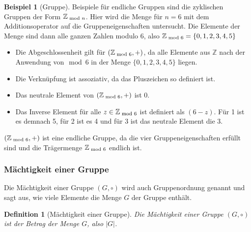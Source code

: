 \documentclass[12pt,a4paper, usenames, dvipsnames]{article}
\theoremstyle{mystyle}
\newtheorem{definition}{Definition}
\theoremstyle{definition}
\newtheorem{bsp}{Beispiel}[definition]
\begin{document}
\begin{bsp}[Gruppe]

Beispiele für endliche Gruppen sind die zyklischen Gruppen der Form $\mathbb{Z}_{\hspace*{-0.3em}\mod n}$. Hier wird die Menge für $n=6$ mit dem Additionsoperator auf die Gruppeneigenschaften untersucht. Die Elemente der Menge sind dann alle ganzen Zahlen modulo 6, also $\mathbb{Z}_{\hspace*{-0.3em}\mod 6}=\{0,1,2,3,4,5\}$
\begin{itemize}
\item Die Abgeschlossenheit gilt für $(\mathbb{Z}_{\hspace*{-0.3em}\mod 6}, +)$, da alle Elemente aus $\mathbb{Z}$ nach der Anwendung von$\mod 6$ in der Menge $\{0,1,2,3,4,5\}$ liegen.
\item Die Verknüpfung ist assoziativ, da das Pluszeichen so definiert ist.
\item Das neutrale Element von $(\mathbb{Z}_{\hspace*{-0.3em}\mod 6}, +)$ ist $0$.
\item Das Inverse Element für alle $z \in \mathbb{Z}_{\hspace*{-0.3em}\mod 6}$ ist definiert als $(6-z)$. Für 1 ist es demnach 5, für 2 ist es 4 und für 3 ist das neutrale Element die 3.
\end{itemize}

$(\mathbb{Z}_{\hspace*{-0.3em}\mod 6}, +)$ ist eine endliche Gruppe, da die vier Gruppeneigenschaften erfüllt sind und die Trägermenge $\mathbb{Z}_{\hspace*{-0.3em}\mod 6}$ endlich ist.

\end{bsp}

\subsubsection*{Mächtigkeit einer Gruppe}

\label{Abschnitt_MächtigkeitGruppe}

Die Mächtigkeit einer Gruppe $(G, \circ)$ wird auch Gruppenordnung genannt und sagt aus, wie viele Elemente die Menge $G$ der Gruppe enthält.

\begin{definition}[Mächtigkeit einer Gruppe]
Die Mächtigkeit einer Gruppe $(G, \circ)$ ist der Betrag der Menge $G$, also $|G|$. 
\end{definition}
\end{document}
